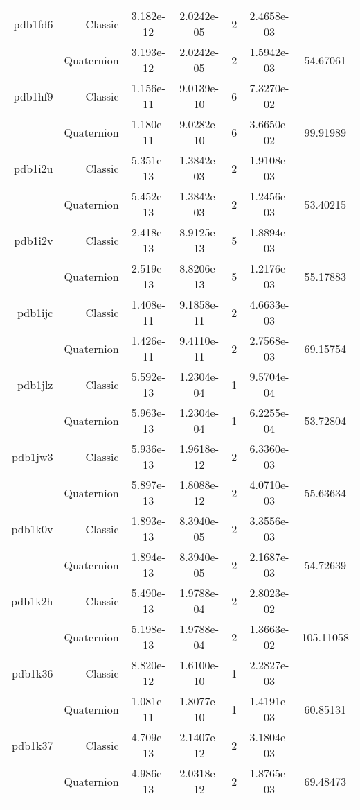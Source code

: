 \begin{xltabular}{\textwidth}{r|rS[table-format=1.3e+2]S[table-format=1.4e+2]cS[table-format=1.4e+2]S[table-format=-1.5]}
pdb1fd6 & Classic & 3.182e-12 & 2.0242e-05 & 2 & 2.4658e-03 & \\
& Quaternion & 3.193e-12 & 2.0242e-05 & 2 & 1.5942e-03 & 54.67061\\  \addlinespace
pdb1hf9 & Classic & 1.156e-11 & 9.0139e-10 & 6 & 7.3270e-02 & \\
& Quaternion & 1.180e-11 & 9.0282e-10 & 6 & 3.6650e-02 & 99.91989\\  \addlinespace
pdb1i2u & Classic & 5.351e-13 & 1.3842e-03 & 2 & 1.9108e-03 & \\
& Quaternion & 5.452e-13 & 1.3842e-03 & 2 & 1.2456e-03 & 53.40215\\  \addlinespace
pdb1i2v & Classic & 2.418e-13 & 8.9125e-13 & 5 & 1.8894e-03 & \\
& Quaternion & 2.519e-13 & 8.8206e-13 & 5 & 1.2176e-03 & 55.17883\\  \addlinespace
pdb1ijc & Classic & 1.408e-11 & 9.1858e-11 & 2 & 4.6633e-03 & \\
& Quaternion & 1.426e-11 & 9.4110e-11 & 2 & 2.7568e-03 & 69.15754\\  \addlinespace
pdb1jlz & Classic & 5.592e-13 & 1.2304e-04 & 1 & 9.5704e-04 & \\
& Quaternion & 5.963e-13 & 1.2304e-04 & 1 & 6.2255e-04 & 53.72804\\  \addlinespace
pdb1jw3 & Classic & 5.936e-13 & 1.9618e-12 & 2 & 6.3360e-03 & \\
& Quaternion & 5.897e-13 & 1.8088e-12 & 2 & 4.0710e-03 & 55.63634\\  \addlinespace
pdb1k0v & Classic & 1.893e-13 & 8.3940e-05 & 2 & 3.3556e-03 & \\
& Quaternion & 1.894e-13 & 8.3940e-05 & 2 & 2.1687e-03 & 54.72639\\  \addlinespace
pdb1k2h & Classic & 5.490e-13 & 1.9788e-04 & 2 & 2.8023e-02 & \\
& Quaternion & 5.198e-13 & 1.9788e-04 & 2 & 1.3663e-02 & 105.11058\\  \addlinespace
pdb1k36 & Classic & 8.820e-12 & 1.6100e-10 & 1 & 2.2827e-03 & \\
& Quaternion & 1.081e-11 & 1.8077e-10 & 1 & 1.4191e-03 & 60.85131\\  \addlinespace
pdb1k37 & Classic & 4.709e-13 & 2.1407e-12 & 2 & 3.1804e-03 & \\
& Quaternion & 4.986e-13 & 2.0318e-12 & 2 & 1.8765e-03 & 69.48473\\  \addlinespace

\end{xltabular}
